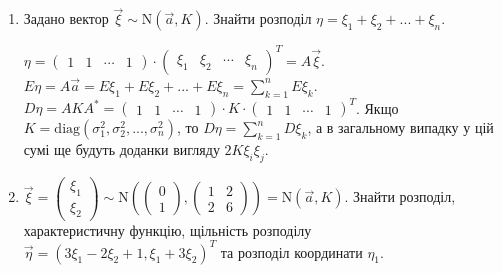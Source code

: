 \begin{example}
    \begin{enumerate}
        \item Задано вектор $\vec{\xi} \sim \mathrm{N}(\vec{a}, K)$. Знайти розподіл $\eta = \xi_1 + \xi_2 + ... + \xi_n$.

        $\eta = \begin{pmatrix}
            1 & 1 & \cdots & 1
        \end{pmatrix}\cdot
        \begin{pmatrix}
            \xi_1 & \xi_2 & \cdots & \xi_n
        \end{pmatrix}^T = A\vec{\xi}$.
        $E\eta = A\vec{a} = E\xi_1 + E\xi_2 + ... + E\xi_n = \sum\limits_{k=1}^n E\xi_k$.
        $D\eta = A K A^{*} = \begin{pmatrix}
            1 & 1 & \cdots & 1
        \end{pmatrix}
        \cdot K \cdot \begin{pmatrix}
            1 & 1 & \cdots & 1
        \end{pmatrix}^T$. Якщо $K = \mathrm{diag}(\sigma_1^2, \sigma_2^2, ..., \sigma_n^2)$, то $D\eta = \sum\limits_{k=1}^n D\xi_k$,
        а в загальному випадку у цій сумі ще будуть доданки вигляду $2K\xi_i\xi_j$.
        \item $\vec{\xi} = \begin{pmatrix}
            \xi_1 \\ \xi_2
        \end{pmatrix} \sim \mathrm{N}\left( \begin{pmatrix}
            0 \\ 1
        \end{pmatrix}, \begin{pmatrix}
            1 & 2 \\
            2 & 6
        \end{pmatrix}\right) = \mathrm{N}(\vec{a}, K)$. Знайти розподіл, характеристичну функцію, щільність розподілу 
        $\vec{\eta} = (3\xi_1-2\xi_2+1, \xi_1+3\xi_2)^T$ та розподіл координати $\eta_1$.


\end{enumerate}
\end{example}
